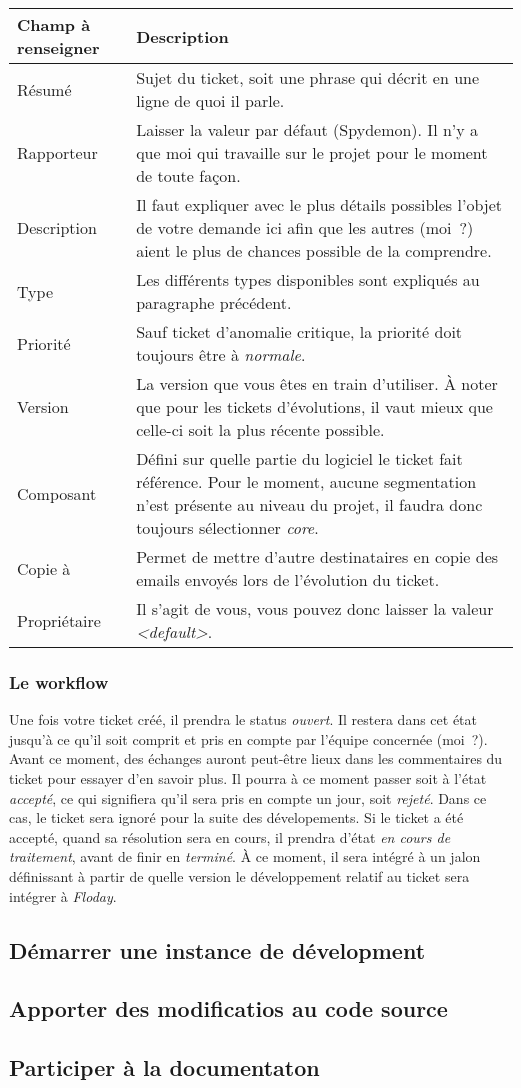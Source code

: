 \begin{tabular}{|p{3cm}|p{10cm}|}
	\hline
	Champ à renseigner & Description\\
	\hline
	Résumé & Sujet du ticket, soit une phrase qui décrit en une ligne de quoi il parle.\\
	Rapporteur & Laisser la valeur par défaut (Spydemon). Il n'y a que moi qui travaille sur le projet pour le moment de toute façon.\\
	Description & Il faut expliquer avec le plus détails possibles l'objet de votre demande ici afin que les autres (moi~?) aient le plus de chances possible de la comprendre.\\
	Type & Les différents types disponibles sont expliqués au paragraphe précédent.\\
	Priorité & Sauf ticket d'anomalie critique, la priorité doit toujours être à \emph{normale}.\\
	Version & La version que vous êtes en train d'utiliser. À noter que pour les tickets d'évolutions, il vaut mieux que celle-ci soit la plus récente possible.\\
	Composant & Défini sur quelle partie du logiciel le ticket fait référence. Pour le moment, aucune segmentation n'est présente au niveau du projet, il faudra donc toujours sélectionner \emph{core}.\\
	Copie à & Permet de mettre d'autre destinataires en copie des emails envoyés lors de l'évolution du ticket.\\
	Propriétaire & Il s'agit de vous, vous pouvez donc laisser la valeur \emph{<default>}.\\
	\hline
\end{tabular}
\newline

\subsubsection{Le workflow}

Une fois votre ticket créé, il prendra le status \emph{ouvert}.
Il restera dans cet état jusqu'à ce qu'il soit comprit et pris en compte par l'équipe concernée (moi~?).
Avant ce moment, des échanges auront peut-être lieux dans les commentaires du ticket pour essayer d'en savoir plus.
Il pourra à ce moment passer soit à l'état \emph{accepté}, ce qui signifiera qu'il sera pris en compte un jour, soit \emph{rejeté}.
Dans ce cas, le ticket sera ignoré pour la suite des dévelopements.
Si le ticket a été accepté, quand sa résolution sera en cours, il prendra d'état \emph{en cours de traitement}, avant de finir en \emph{terminé}.
À ce moment, il sera intégré à un jalon définissant à partir de quelle version le développement relatif au ticket sera intégrer à \emph{Floday}.

\subsection{Démarrer une instance de dévelopment}
\subsection{Apporter des modificatios au code source}
\subsection{Participer à la documentaton}
